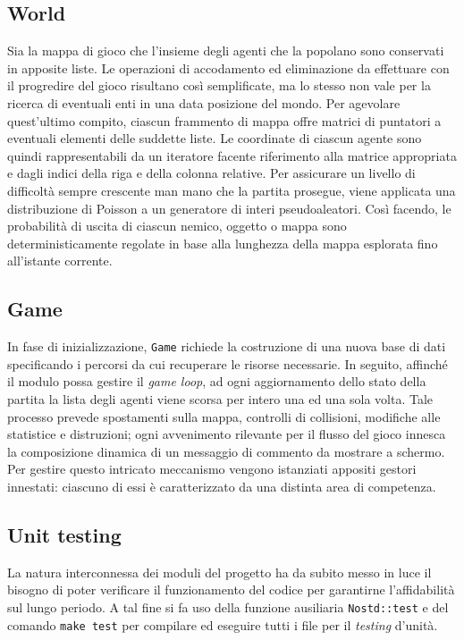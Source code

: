 \documentclass[a4paper]{article}
\begin{document}
\subsection{World}

Sia la mappa di gioco che l'insieme degli agenti che la popolano sono conservati
in apposite liste. Le operazioni di accodamento ed eliminazione da effettuare
con il progredire del gioco risultano cos\`i semplificate, ma lo stesso non vale
per la ricerca di eventuali enti in una data posizione del mondo. Per agevolare
quest'ultimo compito, ciascun frammento di mappa offre matrici di puntatori
a eventuali elementi delle suddette liste. Le coordinate di ciascun agente sono
quindi rappresentabili da un iteratore facente riferimento alla matrice
appropriata e dagli indici della riga e della colonna relative. Per assicurare
un livello di difficolt\`a sempre crescente man mano che la partita prosegue,
viene applicata una distribuzione di Poisson a un generatore di interi
pseudoaleatori. Cos\`i facendo, le probabilità di uscita di ciascun nemico,
oggetto o mappa sono deterministicamente regolate in base alla lunghezza della
mappa esplorata fino all'istante corrente.

\subsection{Game}

In fase di inizializzazione, \verb!Game! richiede la costruzione di una nuova
base di dati specificando i percorsi da cui recuperare le risorse necessarie.
In seguito, affinch\'e il modulo possa gestire il \emph{game loop}, ad ogni
aggiornamento dello stato della partita la lista degli agenti viene scorsa per
intero una ed una sola volta. Tale processo prevede spostamenti sulla mappa,
controlli di collisioni, modifiche alle statistice e distruzioni; ogni
avvenimento rilevante per il flusso del gioco innesca la composizione dinamica
di un messaggio di commento da mostrare a schermo. Per gestire questo intricato
meccanismo vengono istanziati appositi gestori innestati: ciascuno di essi \`e
caratterizzato da una distinta area di competenza.

\subsection{Unit testing}

La natura interconnessa dei moduli del progetto ha da subito messo in luce il
bisogno di poter verificare il funzionamento del codice per garantirne
l'affidabilit\`a sul lungo periodo. A tal fine si fa uso della funzione
ausiliaria \verb!Nostd::test! e del comando \verb!make test! per compilare ed
eseguire tutti i file per il \emph{testing} d'unit\`a.
\end{document}
